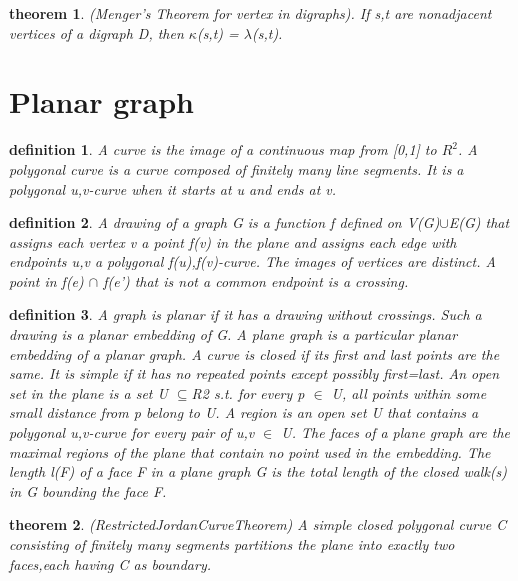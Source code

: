 \documentclass[twocolumn]{article}
\newtheorem{theorem}{theorem}[section]  %
\newtheorem{definition}{definition}
\begin{document}
\begin{CJK*}{UTF8}{bkai}
    \begin{theorem}{(Menger’s Theorem for vertex in digraphs).}
         If s,t are nonadjacent vertices of a digraph D, then $\kappa$(s,t) = $\lambda$(s,t).
    \end{theorem}

\section{Planar graph}
    \begin{definition}
       A curve is the image of a continuous map from [0,1] to ${R}^{2}$. A polygonal curve
 is a curve composed of finitely many line segments. It is a polygonal u,v-curve
 when it starts at u and ends at v.
    \end{definition}

    \begin{definition}
        A drawing of a graph G is a function f defined on V(G)$\cup $E(G) that assigns
 each vertex v a point f(v) in the plane and assigns each edge with endpoints
 u,v a polygonal f(u),f(v)-curve. The images of vertices are distinct. A point
 in f(e) $\cap $ f(e') that is not a common endpoint is a crossing.
    \end{definition}

    \begin{definition}
        A graph is planar if it has a drawing without crossings. Such a drawing is a
 planar embedding of G. A plane graph is a particular planar embedding of a
 planar graph.
 A curve is closed if its first and last points are the same. It is simple if it has
 no repeated points except possibly first=last. An open set in the plane is a set
 U $\subseteq $R2 s.t. for every p $\in$ U, all points within some small distance from p
 belong to U. A region is an open set U that contains a polygonal u,v-curve
 for every pair of u,v $\in$ U.
 The faces of a plane graph are the maximal regions of the plane that contain
 no point used in the embedding.
 The length l(F) of a face F in a plane graph G is the total length of the
 closed walk(s) in G bounding the face F.
    \end{definition}

    \begin{theorem}{(RestrictedJordanCurveTheorem)}
         A simple closed polygonal curve C consisting of finitely many segments
 partitions the plane into exactly two faces,each having C as boundary.
    \end{theorem}


\end{CJK*}
\end{document}
